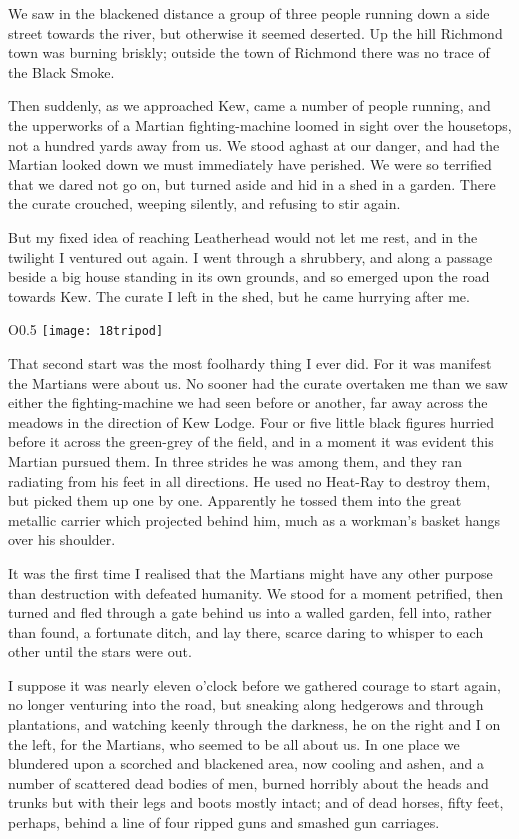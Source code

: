 We saw in the blackened distance a group of three people running down a side street towards the river, but otherwise it seemed deserted. Up the hill Richmond town was burning briskly; outside the town of Richmond there was no trace of the Black Smoke.

Then suddenly, as we approached Kew, came a number of people running, and the upperworks of a Martian fighting-machine loomed in sight over the housetops, not a hundred yards away from us. We stood aghast at our danger, and had the Martian looked down we must immediately have perished. We were so terrified that we dared not go on, but turned aside and hid in a shed in a garden. There the curate crouched, weeping silently, and refusing to stir again.

But my fixed idea of reaching Leatherhead would not let me rest, and in the twilight I ventured out again. I went through a shrubbery, and along a passage beside a big house standing in its own grounds, and so emerged upon the road towards Kew. The curate I left in the shed, but he came hurrying after me.

\begin{wrapfigure}{O}{0.5\textwidth}
\centering
\texttt{[image: 18tripod]}
\end{wrapfigure}

That second start was the most foolhardy thing I ever did. For it was manifest the Martians were about us. No sooner had the curate overtaken me than we saw either the fighting-machine we had seen before or another, far away across the meadows in the direction of Kew Lodge. Four or five little black figures hurried before it across the green-grey of the field, and in a moment it was evident this Martian pursued them. In three strides he was among them, and they ran radiating from his feet in all directions. He used no Heat-Ray to destroy them, but picked them up one by one. Apparently he tossed them into the great metallic carrier which projected behind him, much as a workman's basket hangs over his shoulder.

It was the first time I realised that the Martians might have any other purpose than destruction with defeated humanity. We stood for a moment petrified, then turned and fled through a gate behind us into a walled garden, fell into, rather than found, a fortunate ditch, and lay there, scarce daring to whisper to each other until the stars were out.

I suppose it was nearly eleven o'clock before we gathered courage to start again, no longer venturing into the road, but sneaking along hedgerows and through plantations, and watching keenly through the darkness, he on the right and I on the left, for the Martians, who seemed to be all about us. In one place we blundered upon a scorched and blackened area, now cooling and ashen, and a number of scattered dead bodies of men, burned horribly about the heads and trunks but with their legs and boots mostly intact; and of dead horses, fifty feet, perhaps, behind a line of four ripped guns and smashed gun carriages.

